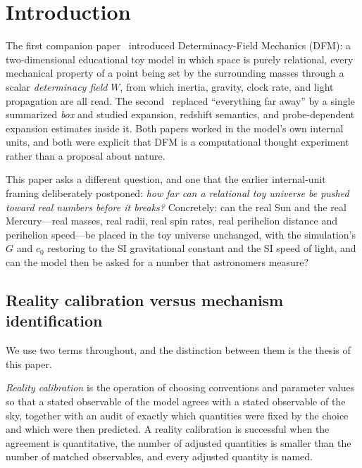 \documentclass[aps,reprint,amsmath,amssymb,nofootinbib,superscriptaddress,floatfix]{revtex4-2}
\begin{document}
\section{Introduction}
\label{sec:intro}

The first companion paper~\cite{DFM1} introduced Determinacy-Field
Mechanics (DFM): a two-dimensional educational toy model in which
space is purely relational, every mechanical property of a point being
set by the surrounding masses through a scalar \emph{determinacy
field} $W$, from which inertia, gravity, clock rate, and light
propagation are all read.
The second~\cite{DFM2} replaced ``everything far away'' by a single
summarized \emph{box} and studied expansion, redshift semantics, and
probe-dependent expansion estimates inside it.
Both papers worked in the model's own internal units, and both were
explicit that DFM is a computational thought experiment rather than a
proposal about nature.

This paper asks a different question, and one that the earlier
internal-unit framing deliberately postponed: \emph{how far can a
relational toy universe be pushed toward real numbers before it
breaks?}
Concretely: can the real Sun and the real Mercury---real masses, real
radii, real spin rates, real perihelion distance and perihelion
speed---be placed in the toy universe unchanged, with the simulation's
$G$ and $c_0$ restoring to the SI gravitational constant and the SI
speed of light, and can the model then be asked for a number that
astronomers measure?

\subsection{Reality calibration versus mechanism identification}
\label{sec:definitions}

We use two terms throughout, and the distinction between them is the
thesis of this paper.

\emph{Reality calibration} is the operation of choosing conventions and
parameter values so that a stated observable of the model agrees with
a stated observable of the sky, together with an audit of exactly
which quantities were fixed by the choice and which were then
predicted.
A reality calibration is successful when the agreement is quantitative,
the number of adjusted quantities is smaller than the number of
matched observables, and every adjusted quantity is named.
\end{document}

